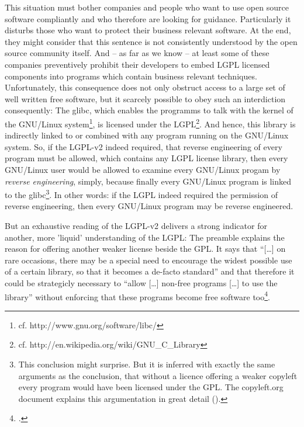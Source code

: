 This situation must bother companies and people who want to use open source
software compliantly and who therefore are looking for guidance. Particularly it
disturbs those who want to protect their business relevant software. At the end,
they might consider that this sentence is not consistently understood by the
open source community itself. And -- as far as we know -- at least some of these
companies preventively prohibit their developers to embed LGPL licensed
components into programs which contain business relevant techniques.
Unfortunately, this consequence does not only obstruct access to a large set of
well written free software, but it scarcely possible to obey such an
interdiction consequently: The glibc, which enables the programms to talk with
the kernel of the GNU/Linux system\footnote{cf.
http://www.gnu.org/software/libc/}, is licensed under the LGPL\footnote{cf.
http://en.wikipedia.org/wiki/GNU\_C\_Library}. And hence, this library is
indirectly linked to or combined with any program running on the GNU/Linux
system. So, if the LGPL-v2 indeed required, that reverse engineering of every
program must be allowed, which contains any LGPL license library, then every
GNU/Linux user would be allowed to examine every GNU/Linux progam by
\emph{reverse engineering}, simply, because finally every GNU/Linux program is
linked to the glibc\footnote{This conclusion might surprise. But it is inferred
with exactly the same arguments as the conclusion, that without a licence
offering a weaker copyleft every program would have been licensed under the GPL.
The copyleft.org document explains this argumentation in great detail
(\cite[cf.][56f]{KuhSebGin2014a}).}. In other words: if the LGPL indeed required
the permission of reverse engineering, then every GNU/Linux program may be
reverse engineered.

But an exhaustive reading of the LGPL-v2 delivers a strong indicator for
another, more 'liquid' understanding of the LGPL: The preamble explains the
reason for offering another weaker license beside the GPL. It says that
\enquote{[\ldots] on rare occasions, there may be a special need to encourage
the widest possible use of a certain library, so that it becomes a de-facto
standard} and that therefore it could be strategicly necessary to \enquote{allow
[\ldots] non-free programs [\ldots] to use the library} without enforcing that
these programs become free software too\footcite[cf.][\nopage wp,
§preamble]{Lgpl21OsiLicense1999a}.


